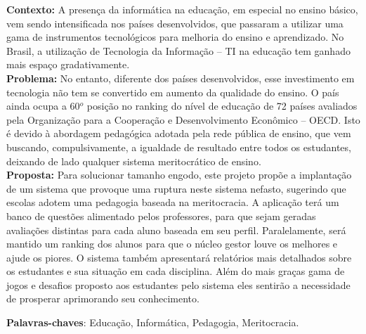 \documentclass[
	article,			%
	11pt,				%
	oneside,			%
	a4paper,			%
	english,			%
	brazil,				%
	sumario=tradicional
	]{abntex2}
\begin{document}
\frenchspacing 



\maketitle


\begin{resumoumacoluna}
	
 \textbf{Contexto:} A presença da informática na educação, em especial no ensino básico, vem sendo intensificada nos países desenvolvidos, que passaram a utilizar uma gama de instrumentos tecnológicos para melhoria do ensino e aprendizado. No Brasil, a utilização de Tecnologia da Informação – TI na educação tem ganhado mais espaço gradativamente. \\
 \textbf{Problema:} No entanto, diferente dos países desenvolvidos, esse investimento em tecnologia não tem se convertido em aumento da qualidade do ensino. O país ainda ocupa a 60$^{o}$  posição no ranking do nível de educação de 72 países avaliados pela Organização para a Cooperação e Desenvolvimento Econômico – OECD. Isto é devido à abordagem pedagógica adotada pela rede pública de ensino, que vem buscando, compulsivamente, a igualdade de resultado entre todos os estudantes, deixando de lado qualquer sistema meritocrático de ensino.\\
 \textbf{Proposta:} Para solucionar tamanho engodo, este projeto propõe a implantação de um sistema que provoque uma ruptura neste sistema nefasto, sugerindo que escolas adotem uma pedagogia baseada na meritocracia. A aplicação terá um banco de questões alimentado pelos professores, para que sejam geradas avaliações distintas para cada aluno baseada em seu perfil. Paralelamente, será mantido um ranking dos alunos para que o núcleo gestor louve os melhores e ajude os piores. O sistema também apresentará relatórios mais detalhados sobre os estudantes e sua situação em cada disciplina. Além do mais graças gama de jogos e desafios proposto aos estudantes pelo sistema eles sentirão a necessidade de prosperar aprimorando seu conhecimento. 
 

 \vspace{\onelineskip}
 
 \noindent
 \textbf{Palavras-chaves}: Educação, Informática, Pedagogia, Meritocracia.
\end{resumoumacoluna}
\end{document}
